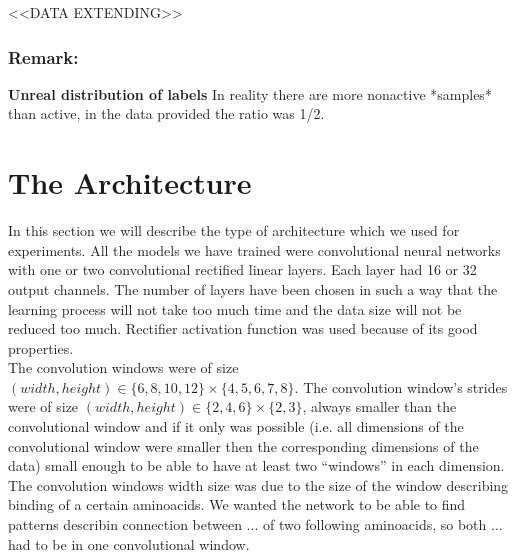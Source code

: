 \documentclass[a4paper,10pt]{report}
\begin{document}


	
	<<DATA EXTENDING>>
      
      \subsubsection{Remark:}
      \textbf{Unreal distribution of labels} In reality there are more nonactive *samples* than active, in the data provided the ratio was 1/2.\\
      
	
	
      \section{The Architecture}
      In this section we will describe the type of architecture which we used for experiments. All the models we have trained were convolutional neural networks with one or two convolutional rectified linear layers. Each layer had 16 or 32 output channels. The number of layers have been chosen in such a way that the learning process will not take too much time and the data size will not be reduced too much. Rectifier activation function was used because of its good properties.\\ 
   
      The convolution windows were of size $(width, height) \in \{6, 8, 10, 12\} \times \{4, 5, 6, 7, 8\}$. The convolution window's strides were of size $(width, height) \in \{2, 4, 6\} \times \{2, 3\}$, always smaller than the convolutional window and if it only was possible (i.e. all dimensions of the convolutional window were smaller then the corresponding dimensions of the data) small enough to be able to have at least two ``windows'' in each dimension. The convolution windows width size was due to the size of the window describing binding of a certain aminoacids. We wanted the network to be able to find patterns describin connection between ... of two following aminoacids, so both ... had to be in one convolutional window.\\
      
\end{document}
